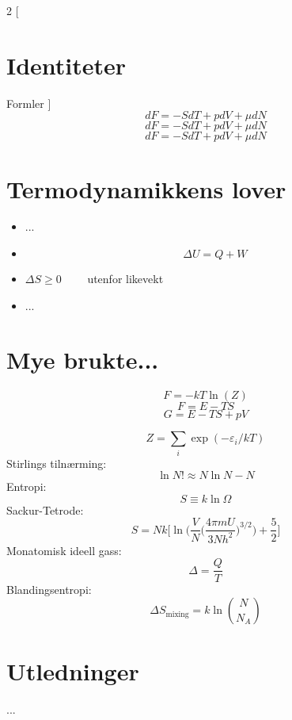 \documentclass{article}
\begin{document}
\begin{multicols}{2}
[
\section{Identiteter}
Formler
]
$$dF=-SdT+pdV+\mu dN$$
$$dF=-SdT+pdV+\mu dN$$
$$dF=-SdT+pdV+\mu dN$$

\section{Termodynamikkens lover}
\begin{itemize}
\item ...
\item $$\Delta U=Q+W$$
\item $\Delta S\ge 0 \qquad$ utenfor likevekt
\item ...
\end{itemize}

\section{Mye brukte...}
$$F=-kT\ln(Z)$$
$$F=E-TS$$
$$G=E-TS+pV$$

$$Z=\sum_i\exp(-\varepsilon_i/kT)$$
Stirlings tiln{\ae}rming:
$$\ln N! \approx N\ln N - N$$
Entropi:
$$S\equiv k\ln\Omega$$
Sackur-Tetrode:
$$S=Nk\Bigg[\ln\Bigg(\frac{V}{N}\bigg(\frac{4\pi mU}{3Nh^2}\bigg)^{3/2}\Bigg)+\frac{5}{2}\Bigg]$$
Monatomisk ideell gass:
$$\Delta =\frac{Q}{T}$$
Blandingsentropi:
$$\Delta S_{\text{mixing}}=k\ln\binom{N}{N_A}$$

\section{Utledninger}
...

\end{multicols}

 
\end{document}
